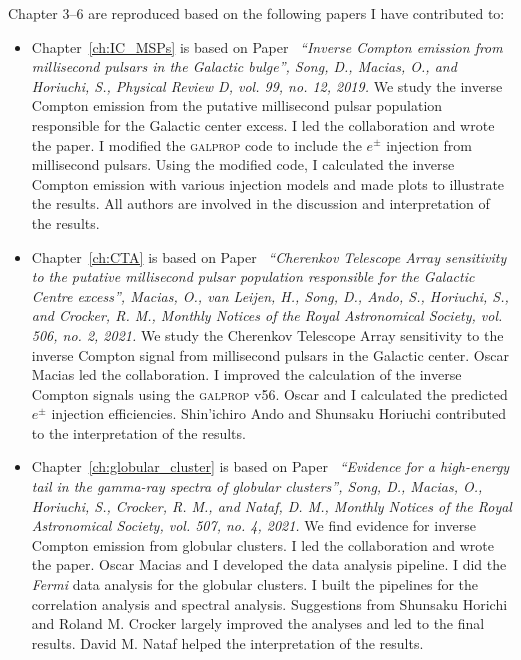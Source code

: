 \documentclass[doublespace,nopageskip]{VTthesis}
\begin{document}
Chapter 3--6 are reproduced based on the following papers I have contributed to:
\begin{itemize}
    \item Chapter~\ref{ch:IC_MSPs} is based on Paper~\cite{2019PhRvD..99l3020S} \emph{``Inverse Compton emission from millisecond pulsars in the Galactic bulge'', Song, D., Macias, O., and Horiuchi, S., Physical Review D, vol. 99, no. 12, 2019.} We study the inverse Compton emission from the putative millisecond pulsar population responsible for the Galactic center excess. I led the collaboration and wrote the paper. I modified the \textsc{galprop} code to include the $e^\pm$ injection from millisecond pulsars. Using the modified code, I calculated the inverse Compton emission with various injection models and made plots to illustrate the results. All authors are involved in the discussion and interpretation of the results.
    \item Chapter~\ref{ch:CTA} is based on Paper~\cite{2021MNRAS.506.1741M} \emph{``Cherenkov Telescope Array sensitivity to the putative millisecond pulsar population responsible for the Galactic Centre excess'', Macias, O., van Leijen, H., Song, D., Ando, S., Horiuchi, S., and Crocker, R. M., Monthly Notices of the Royal Astronomical Society, vol. 506, no. 2, 2021.} We study the Cherenkov Telescope Array sensitivity to the inverse Compton signal from millisecond pulsars in the Galactic center. Oscar Macias led the collaboration. I improved the calculation of the inverse Compton signals using the \textsc{galprop} v56. 
    Oscar and I calculated the predicted $e^\pm$ injection efficiencies. Shin'ichiro Ando and Shunsaku Horiuchi contributed to the interpretation of the results.
    \item Chapter~\ref{ch:globular_cluster} is based on Paper~\cite{2021MNRAS.507.5161S} \emph{``Evidence for a high-energy tail in the gamma-ray spectra of globular clusters'', Song, D., Macias, O., Horiuchi, S., Crocker, R. M., and Nataf, D. M., Monthly Notices of the Royal Astronomical Society, vol. 507, no. 4, 2021.} We find evidence for inverse Compton emission from globular clusters. I led the collaboration and wrote the paper. Oscar Macias and I developed the data analysis pipeline. I did the \textit{Fermi} data analysis for the globular clusters. I built the pipelines for the correlation analysis and spectral analysis. Suggestions from Shunsaku Horichi and Roland M. Crocker largely improved the analyses and led to the final results. David M. Nataf helped the interpretation of the results.

\end{itemize}
\end{document}
